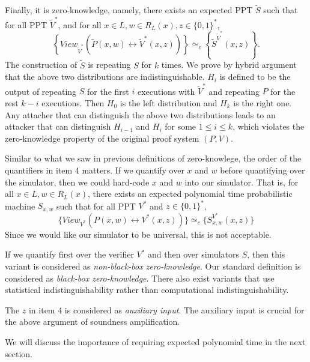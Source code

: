 Finally, it  is zero-knowledge, namely, there exists an expected PPT $\tilde S$ such that for all PPT $\tilde V^*$, and for all $x \in L, w \in R_L (x), z \in \{ 0, 1 \}^*$,
$$\left\{ View_{\tilde V^*} (\tilde P(x,w) \leftrightarrow \tilde V^* (x,z)) \right\} \simeq_c \left\{ \tilde S^{\tilde V^*} (x,z) \right\}.$$
The construction of $\tilde S$ is repeating $S$ for $k$ times. We prove by hybrid argument that the above two distributions are indistinguishable. $H_i$ is defined to be the output of repeating $S$ for the first $i$ executions with $\tilde V^*$ and repeating $P$ for the rest $k-i$ executions. Then $H_0$ is the left distribution and $H_k$ is the right one. Any attacher that can distinguish the above two distributions leads to an attacker that can distinguish $H_{i-1}$ and $H_{i}$ for some $1\leq i \leq k$, which violates the zero-knowledge property of the original proof system $(P,V)$.

Similar to what we saw in previous definitions of zero-knowlege, the order of the quantifiers in item 4 matters.
If we quantify over $x$ and $w$ before quantifying over the simulator,
then we could hard-code  $x$ and $w$ into our simulator. That is, for all $x \in L, w \in R_L (x)$, there exists an expected polynomial time probabilistic machine $S_{x,w}$ such that for all PPT $V^*$ and $z \in \{ 0, 1 \}^*$,
$$\{ View_{V^*} (P(x,w) \leftrightarrow V^* (x,z)) \} \simeq_c \{ S_{x,w}^{V^*} (x,z) \} $$
Since we would like our simulator to be universal,  this is not acceptable.

If we quantify first over the verifier $V^*$ and then over simulators $S$, then this variant is considered as \emph{non-black-box zero-knowledge}. Our standard definition is considered as \emph{black-box zero-knowledge}. There  also exist variants that use statistical indistinguishability rather than computational indistinguishability.

The $z$ in item 4 is considered as \emph{auxiliary input}. The auxiliary input is crucial for the above argument of soundness amplification.

We will discuss the importance of requiring expected polynomial time in the next section. \bigskip
%		


